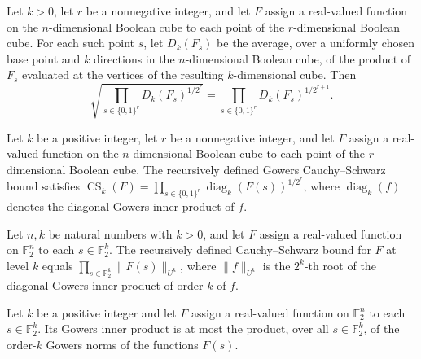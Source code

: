 \begin{theorem}
\label{FABL.sqrt_prod_gowersDiagonal_rpow}
\leanok
{}
Let $k>0$, let $r$ be a nonnegative integer, and let $F$ assign a real-valued function
on the $n$-dimensional Boolean cube to each point of the $r$-dimensional Boolean cube.
For each such point $s$, let $D_k(F_s)$ be the average, over a uniformly chosen base
point and $k$ directions in the $n$-dimensional Boolean cube, of the product of $F_s$
evaluated at the vertices of the resulting $k$-dimensional cube. Then
\[\sqrt{\prod_{s\in\{0,1\}^r} D_k(F_s)^{1/2^r}}=\prod_{s\in\{0,1\}^r}D_k(F_s)^{1/2^{r+1}}.\]
\end{theorem}

\begin{theorem}
\label{FABL.gowersCSBound_eq_prod_rpow}
\leanok
{}
Let $k$ be a positive integer, let $r$ be a nonnegative integer, and let $F$ assign a
real-valued function on the $n$-dimensional Boolean cube to each point of the
$r$-dimensional Boolean cube. The recursively defined Gowers Cauchy–Schwarz bound
satisfies $\displaystyle
\operatorname{CS}_k(F)=\prod_{s\in\{0,1\}^r}\operatorname{diag}_k(F(s))^{1/2^r}$, where
$\operatorname{diag}_k(f)$ denotes the diagonal Gowers inner product of $f$.
\end{theorem}

\begin{theorem}
\label{FABL.gowersCSBound_eq_prod_norm}
\leanok
{}
Let $n,k$ be natural numbers with $k>0$, and let $F$ assign a real-valued function on
$\mathbb F_2^n$ to each $s\in\mathbb F_2^k$. The recursively defined Cauchy–Schwarz
bound for $F$ at level $k$ equals $\prod_{s\in\mathbb F_2^k}\|F(s)\|_{U^k}$, where
$\|f\|_{U^k}$ is the $2^k$-th root of the diagonal Gowers inner product of order $k$ of
$f$.
\end{theorem}

\begin{theorem}
\label{FABL.gowers_cauchy_schwarz}
\leanok
{}
Let $k$ be a positive integer and let $F$ assign a real-valued function on
$\mathbb{F}_2^n$ to each $s\in\mathbb{F}_2^k$. Its Gowers inner product is at most the
product, over all $s\in\mathbb{F}_2^k$, of the order-$k$ Gowers norms of the functions
$F(s)$.
\end{theorem}

